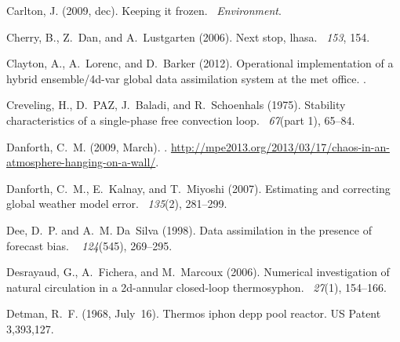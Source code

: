 \documentclass[12pt]{report}
\begin{document}
\begin{thebibliography}{}
Carlton, J. (2009, dec).
\newblock Keeping it frozen.
~{\em Environment}.

Cherry, B., Z.~Dan, and A.~Lustgarten (2006).
\newblock Next stop, lhasa.
~{\em 153}, 154.

Clayton, A., A.~Lorenc, and D.~Barker (2012).
\newblock Operational implementation of a hybrid ensemble/4d-var global data
  assimilation system at the met office.
.

Creveling, H., D.~PAZ, J.~Baladi, and R.~Schoenhals (1975).
\newblock Stability characteristics of a single-phase free convection loop.
~{\em 67\/}(part 1), 65--84.

Danforth, C.~M. (2009, March).
.
\newblock
  \url{http://mpe2013.org/2013/03/17/chaos-in-an-atmosphere-hanging-on-a-wall/}.

Danforth, C.~M., E.~Kalnay, and T.~Miyoshi (2007).
\newblock Estimating and correcting global weather model error.
~{\em 135\/}(2), 281--299.

Dee, D.~P. and A.~M. Da~Silva (1998).
\newblock Data assimilation in the presence of forecast bias.
~{\em
  124\/}(545), 269--295.

Desrayaud, G., A.~Fichera, and M.~Marcoux (2006).
\newblock Numerical investigation of natural circulation in a 2d-annular
  closed-loop thermosyphon.
~{\em 27\/}(1),
  154--166.

Detman, R.~F. (1968, July~16).
\newblock Thermos iphon depp pool reactor.
\newblock US Patent 3,393,127.


\end{thebibliography}
\end{document}
